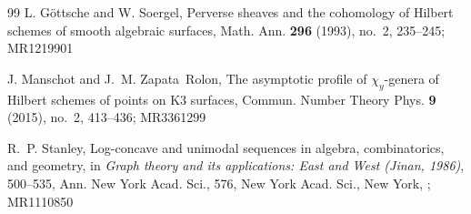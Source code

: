 \documentclass[12pt]{amsart}
\theoremstyle{plain}
\theoremstyle{definition}
\theoremstyle{remark}
\begin{document}
\begin{thebibliography}{99}
L. G\"ottsche and W. Soergel, Perverse sheaves and the cohomology of Hilbert schemes of smooth algebraic surfaces, Math. Ann. {\bf 296} (1993), no.~2, 235--245; MR1219901

J. Manschot and J.~M. Zapata~Rolon, The asymptotic profile of $\chi_y$-genera of Hilbert schemes of points on K3 surfaces, Commun. Number Theory Phys. {\bf 9} (2015), no.~2, 413--436; MR3361299

R.~P. Stanley, Log-concave and unimodal sequences in algebra, combinatorics, and geometry, in {\it Graph theory and its applications: East and West (Jinan, 1986)}, 500--535, Ann. New York Acad. Sci., 576, New York Acad. Sci., New York, ; MR1110850

\end{thebibliography}
\end{document}
